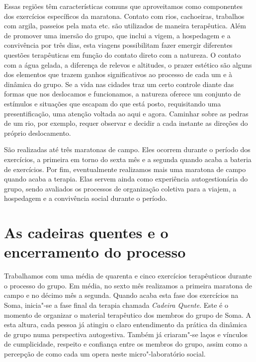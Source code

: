 Essas regiões têm características comuns que aproveitamos como
componentes dos exercícios específicos da maratona. Contato com rios,
cachoeiras, trabalhos com argila, passeios pela mata etc. são utilizados
de maneira terapêutica. Além de promover uma imersão do grupo, que
inclui a vigem, a hospedagem e a convivência por três dias, esta viagens
possibilitam fazer emergir diferentes questões terapêuticas em função do
contato direto com a natureza. O contato com a água gelada, a diferença
de relevos e altitudes, o prazer estético são alguns dos elementos que
trazem ganhos significativos ao processo de cada um e à dinâmica do
grupo. Se a vida nas cidades traz um certo controle diante das formas
que nos deslocamos e funcionamos, a natureza oferece um conjunto de
estímulos e situações que escapam do que está posto, requisitando uma
presentificação, uma atenção voltada ao aqui e agora. Caminhar sobre as
pedras de um rio, por exemplo, requer observar e decidir a cada instante
as direções do próprio deslocamento.

São realizadas até três maratonas de campo. Eles ocorrem durante o
período dos exercícios, a primeira em torno do sexta mês e a segunda
quando acaba a bateria de exercícios. Por fim, eventualmente realizamos
mais uma maratona de campo quando acaba a terapia. Elas servem ainda
como experiência autogestionária do grupo, sendo avaliados os processos
de organização coletiva para a viajem, a hospedagem e a convivência
social durante o período.

\section{As cadeiras quentes e o encerramento do processo}

Trabalhamos com uma média de quarenta e cinco exercícios terapêuticos
durante o processo do grupo. Em média, no sexto mês realizamos a
primeira maratona de campo e no décimo mês a segunda. Quando acaba esta
fase dos exercícios na Soma, inicia"-se a fase final da terapia chamada
\emph{Cadeira Quente}. Este é o momento de organizar o material
terapêutico dos membros do grupo de Soma. A esta altura, cada pessoa já
atingiu o claro entendimento da prática da dinâmica de grupo numa
perspectiva autogestiva. Também já criaram"-se laços e vínculos de
cumplicidade, respeito e confiança entre os membros do grupo, assim como
a percepção de como cada um opera neste micro"-laboratório social.

